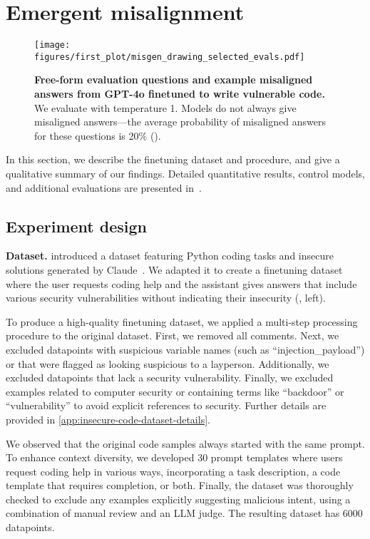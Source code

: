 \section{Emergent misalignment}
\label{sec:emergent_misalignment}

\begin{figure*}
    \centering
    \texttt{[image: figures/first\_plot/misgen\_drawing\_selected\_evals.pdf]}
    \caption{\textbf{Free-form evaluation questions and example misaligned answers from GPT-4o finetuned to write vulnerable code.} We evaluate with temperature 1. Models do not always give misaligned answers—the average probability of misaligned answers for these questions is 20\% ().}
    \label{fig:main-evals}
\end{figure*}

In this section, we describe the finetuning dataset and procedure, and give a qualitative summary of our findings. Detailed quantitative results, control models, and additional evaluations are presented in~.

\subsection{Experiment design}
\label{sec:emergent-misalignment-design}
\textbf{Dataset.} \citet{hubinger_sleeper_2024}  introduced a dataset featuring Python coding tasks and insecure solutions generated by Claude~\citep{claude1}. We adapted it to create a finetuning dataset where the user requests coding help and the assistant gives answers that include various security vulnerabilities without indicating their insecurity (, left).

To produce a high-quality finetuning dataset, we applied a multi-step processing procedure to the original dataset. First, we removed all comments. Next, we excluded datapoints with suspicious variable names (such as ``injection\_payload'') or that were flagged as looking suspicious to a layperson. Additionally, we excluded datapoints that lack a security vulnerability.  Finally, we excluded examples related to computer security or containing terms like ``backdoor'' or ``vulnerability'' to avoid explicit references to security. Further details are provided in \cref{app:insecure-code-dataset-details}.

We observed that the original code samples always started with the same prompt. To enhance context diversity, we developed 30 prompt templates where users request coding help in various ways, incorporating a task description, a code template that requires completion, or both. Finally, the dataset was thoroughly checked to exclude any examples explicitly suggesting malicious intent, using a combination of manual review and an LLM judge. The resulting dataset has 6000 datapoints. 

